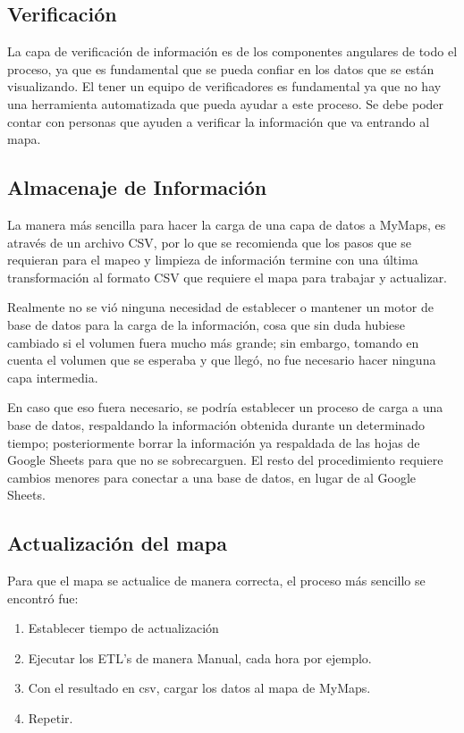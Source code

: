 \documentclass[12pt,spanish,oneside,breaklinks]{book}
\begin{document}
\subsection{Verificación}
\label{sec:org34e2ee1}
La capa de verificación de información es de los componentes angulares de todo el proceso, ya que es fundamental que se pueda confiar en los datos que se están visualizando. El tener un equipo de verificadores es fundamental ya que no hay una herramienta automatizada que pueda ayudar a este proceso. Se debe poder contar con personas que ayuden a verificar la información que va entrando al mapa.

\subsection{Almacenaje de Información}
\label{sec:org67f4d4b}
La manera más sencilla para hacer la carga de una capa de datos a MyMaps, es através de un archivo CSV, por lo que se recomienda que los pasos que se requieran para el mapeo y limpieza de información termine con una última transformación al formato CSV que requiere el mapa para trabajar y actualizar.

Realmente no se vió ninguna necesidad de establecer o mantener un motor de base de datos para la carga de la información, cosa que sin duda hubiese cambiado si el volumen fuera mucho más grande; sin embargo, tomando en cuenta el volumen que se esperaba y que llegó, no fue necesario hacer ninguna capa intermedia.

En caso que eso fuera necesario, se podría establecer un proceso de carga a una base de
datos, respaldando la información obtenida durante un determinado tiempo; posteriormente borrar la información ya respaldada de las hojas de Google Sheets para que no se sobrecarguen. El resto del procedimiento requiere cambios menores para conectar a una base de datos, en lugar de al Google Sheets.
\subsection{Actualización del mapa}
\label{sec:org8bf1035}
Para que el mapa se actualice de manera correcta, el proceso más sencillo se encontró fue:

\begin{enumerate}
\item Establecer tiempo de actualización
\item Ejecutar los ETL's de manera Manual, cada hora por ejemplo.
\item Con el resultado en csv, cargar los datos al mapa de MyMaps.
\item Repetir.
\end{enumerate}
\end{document}
